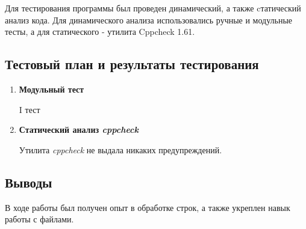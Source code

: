 \documentclass[12pt,a4paper]{report}
\begin{document}
Для тестирования программы был проведен динамический, а также cтатический анализ кода. Для динамического анализа использовались ручные и модульные тесты, а для статического - утилита Cppcheck 1.61.
\subsection{Тестовый план и результаты тестирования}
\begin{enumerate}
\item \textbf{Модульный тест}
\begin{description}
\item[I тест]
\hspace{\parindent}
\begin{flushleft}
\end{flushleft}
\end{description}
\item \textbf{Статический анализ \textit{cppcheck}}

Утилита \textit{cppcheck} не выдала никаких предупреждений.
\end{enumerate}


\subsection{Выводы}
\hspace{\parindent}
В ходе работы был получен опыт в обработке строк, а также укреплен навык работы с файлами.
\end{document}
